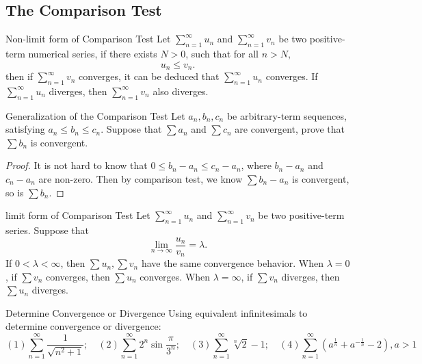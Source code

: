 \subsection{The Comparison Test}

\begin{theorem}{Non-limit form of Comparison Test}{}
  Let $\sum\limits_{n = 1}^{\infty} u_n$ and $\sum\limits_{n = 1}^{\infty}v_n$
  be two positive-term numerical series,
  if there exists $N > 0$, such that for all $n > N$,
  \begin{equation}
    u_n \leq v_n.
  \end{equation}
  then if $\sum\limits_{n = 1}^{\infty} v_n$ converges,
  it can be deduced that $\sum\limits_{n = 1}^{\infty}u_n$ converges.
  If $\sum\limits_{n = 1}^{\infty}u_n$ diverges,
  then $\sum\limits_{n = 1}^{\infty}v_n$ also diverges.
\end{theorem}

\begin{example}{Generalization of the Comparison Test}{}
  Let $a_n, b_n, c_n$ be arbitrary-term sequences,
  satisfying $a_n \leq b_n \leq c_n$.
  Suppose that $\sum a_n$ and $\sum c_n$ are convergent,
  prove that $\sum b_n$ is convergent.
\end{example}

\begin{proof}
  It is not hard to know that $0 \leq b_n - a_n \leq c_n - a_n$,
  where $b_n - a_n$ and $c_n - a_n$ are non-zero.
  Then by comparison test, we know $\sum b_n - a_n$ is convergent,
  so is $\sum b_n$.
\end{proof}

\begin{theorem}{limit form of Comparison Test}{}
  Let $\sum\limits_{n = 1}^{\infty} u_n$ and $\sum\limits_{n = 1}^{\infty}v_n$
  be two positive-term series.
  Suppose that
  \begin{equation}
    \lim \limits _{n \rightarrow \infty} \frac{u_n}{v_n} = \lambda.
  \end{equation}
  If $0 < \lambda < \infty$,
  then $\sum u_n, \sum v_n$ have the same convergence behavior.
  When $\lambda = 0$, if $\sum v_n$ converges,
  then $\sum u_n$ converges.
  When $\lambda = \infty$, if $\sum v_n$ diverges,
  then $\sum u_n$ diverges.
\end{theorem}

\begin{example}{Determine Convergence or Divergence}{}
  Using equivalent infinitesimals to determine convergence or divergence:
  \begin{equation}
    (1) \sum\limits_{n = 1}^{\infty} \frac{1}{\sqrt{n^2 + 1}}; \quad
    (2) \sum\limits_{n = 1}^{\infty} 2^n \sin \frac{\pi}{3^n}; \quad
    (3) \sum\limits_{n = 1}^{\infty} \sqrt[n]{2} - 1; \quad
    (4) \sum\limits_{n = 1}^{\infty} (a^{\frac{1}{n}} + a^{- \frac{1}{n}} - 2), a > 1
  \end{equation}
\end{example}

